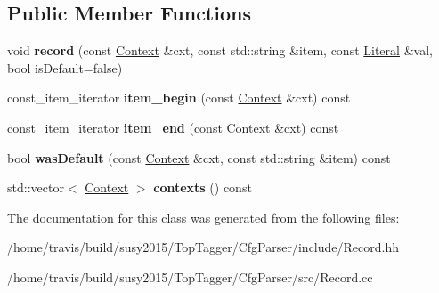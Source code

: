 \subsection*{Public Member Functions}
\begin{DoxyCompactItemize}
\item 
\hypertarget{classcfg_1_1Record_a85c09621795cf3542ec763d6327e81c4}{void {\bfseries record} (const \hyperlink{classcfg_1_1Context}{Context} \&cxt, const std\-::string \&item, const \hyperlink{classcfg_1_1Literal}{Literal} \&val, bool is\-Default=false)}\label{classcfg_1_1Record_a85c09621795cf3542ec763d6327e81c4}

\item 
\hypertarget{classcfg_1_1Record_ae8210318331d2c74c02d215f30fc342e}{const\-\_\-item\-\_\-iterator {\bfseries item\-\_\-begin} (const \hyperlink{classcfg_1_1Context}{Context} \&cxt) const }\label{classcfg_1_1Record_ae8210318331d2c74c02d215f30fc342e}

\item 
\hypertarget{classcfg_1_1Record_ad64483c0ec534a36d9ea84ea53250005}{const\-\_\-item\-\_\-iterator {\bfseries item\-\_\-end} (const \hyperlink{classcfg_1_1Context}{Context} \&cxt) const }\label{classcfg_1_1Record_ad64483c0ec534a36d9ea84ea53250005}

\item 
\hypertarget{classcfg_1_1Record_a391f99fe29ec058075b6810b1b14ca3f}{bool {\bfseries was\-Default} (const \hyperlink{classcfg_1_1Context}{Context} \&cxt, const std\-::string \&item) const }\label{classcfg_1_1Record_a391f99fe29ec058075b6810b1b14ca3f}

\item 
\hypertarget{classcfg_1_1Record_a0808d25ac6925c9acc7acf9411c5db17}{std\-::vector$<$ \hyperlink{classcfg_1_1Context}{Context} $>$ {\bfseries contexts} () const }\label{classcfg_1_1Record_a0808d25ac6925c9acc7acf9411c5db17}

\end{DoxyCompactItemize}


The documentation for this class was generated from the following files\-:\begin{DoxyCompactItemize}
\item 
/home/travis/build/susy2015/\-Top\-Tagger/\-Cfg\-Parser/include/Record.\-hh\item 
/home/travis/build/susy2015/\-Top\-Tagger/\-Cfg\-Parser/src/Record.\-cc\end{DoxyCompactItemize}

